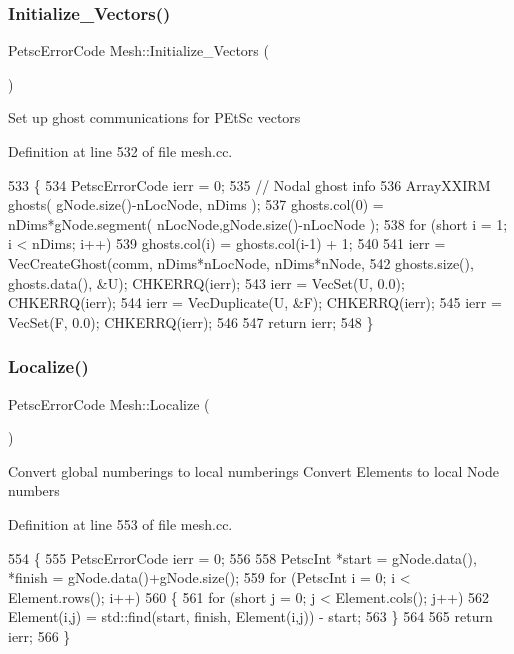 \subsubsection{\texorpdfstring{Initialize\+\_\+\+Vectors()}{Initialize\_Vectors()}}
{\footnotesize\ttfamily Petsc\+Error\+Code Mesh\+::\+Initialize\+\_\+\+Vectors (\begin{DoxyParamCaption}{ }\end{DoxyParamCaption})\hspace{0.3cm}{\ttfamily [protected]}}

Set up ghost communications for P\+Et\+Sc vectors 

Definition at line 532 of file mesh.\+cc.


\begin{DoxyCode}
533 \{
534     PetscErrorCode ierr = 0;
535     \textcolor{comment}{// Nodal ghost info}
536     ArrayXXIRM ghosts( gNode.size()-nLocNode, nDims );
537     ghosts.col(0) = nDims*gNode.segment( nLocNode,gNode.size()-nLocNode );
538     \textcolor{keywordflow}{for} (\textcolor{keywordtype}{short} i = 1; i < nDims; i++)
539       ghosts.col(i) = ghosts.col(i-1) + 1;
540 
541     ierr = VecCreateGhost(comm, nDims*nLocNode, nDims*nNode,
542                           ghosts.size(), ghosts.data(), &U); CHKERRQ(ierr);
543     ierr = VecSet(U, 0.0); CHKERRQ(ierr);
544     ierr = VecDuplicate(U, &F); CHKERRQ(ierr);
545     ierr = VecSet(F, 0.0); CHKERRQ(ierr);
546 
547     \textcolor{keywordflow}{return} ierr;
548 \}
\end{DoxyCode}
\mbox{\label{class_mesh_a54a12376bf99f4f4991af01fc23c9c09}} 
\subsubsection{\texorpdfstring{Localize()}{Localize()}}
{\footnotesize\ttfamily Petsc\+Error\+Code Mesh\+::\+Localize (\begin{DoxyParamCaption}{ }\end{DoxyParamCaption})\hspace{0.3cm}{\ttfamily [protected]}}

Convert global numberings to local numberings Convert Elements to local Node numbers 

Definition at line 553 of file mesh.\+cc.


\begin{DoxyCode}
554 \{
555     PetscErrorCode ierr = 0;
556 
558     PetscInt *start = gNode.data(), *finish = gNode.data()+gNode.size();
559     \textcolor{keywordflow}{for} (PetscInt i = 0; i < Element.rows(); i++)
560     \{
561         \textcolor{keywordflow}{for} (\textcolor{keywordtype}{short} j = 0; j < Element.cols(); j++)
562             Element(i,j) = std::find(start, finish, Element(i,j)) - start;
563     \}
564 
565     \textcolor{keywordflow}{return} ierr;
566 \}
\end{DoxyCode}
\mbox{\label{class_mesh_aa6b19f4fdf210f8937694e8c7d30ea15}} 
